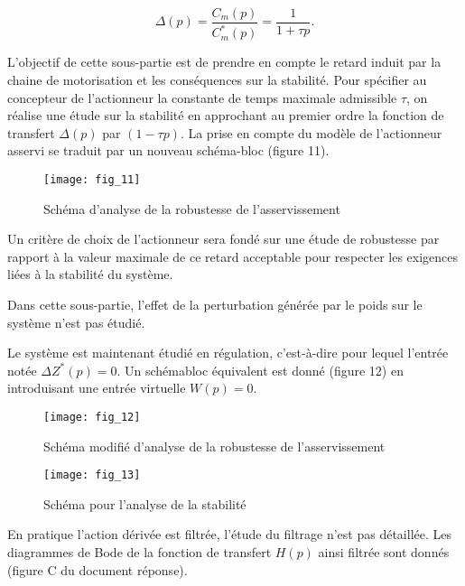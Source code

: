 $$
\Delta(p)=\frac{C_{m}(p)}{C_{m}^{*}(p)}=\frac{1}{1+\tau p} .
$$

L'objectif de cette sous-partie est de prendre en compte le retard induit par la chaine de motorisation et les conséquences sur la stabilité. Pour spécifier au concepteur de l'actionneur la constante de temps maximale admissible $\tau$, on réalise une étude sur la stabilité en approchant au premier ordre la fonction de transfert $\Delta(p)$ par $(1-\tau p)$. La prise en compte du modèle de l'actionneur asservi se traduit par un nouveau schéma-bloc (figure 11).


\begin{figure}[H]
\centering
\texttt{[image: fig\_11]}
\caption{\label{fig:11} Schéma d'analyse de la robustesse de l'asservissement}
\end{figure}


Un critère de choix de l'actionneur sera fondé sur une étude de robustesse par rapport à la valeur maximale de ce retard acceptable pour respecter les exigences liées à la stabilité du système.

Dans cette sous-partie, l'effet de la perturbation générée par le poids sur le système n'est pas étudié.

Le système est maintenant étudié en régulation, c'est-à-dire pour lequel l'entrée notée $\Delta Z^{*}(p)=0$. Un schémabloc équivalent est donné (figure 12) en introduisant une entrée virtuelle $W(p)=0$.

\begin{figure}[H]
\centering
\texttt{[image: fig\_12]}
\caption{\label{fig:12} Schéma modifié d'analyse de la robustesse de l'asservissement}
\end{figure}



\ifprof
\begin{corrige}
\end{corrige}
\else
\fi

\begin{figure}[H]
\centering
\texttt{[image: fig\_13]}
\caption{\label{fig:13} Schéma pour l'analyse de la stabilité}
\end{figure}

En pratique l'action dérivée est filtrée, l'étude du filtrage n'est pas détaillée. Les diagrammes de Bode de la fonction de transfert $H(p)$ ainsi filtrée sont donnés (figure $\mathrm{C}$ du document réponse). 

